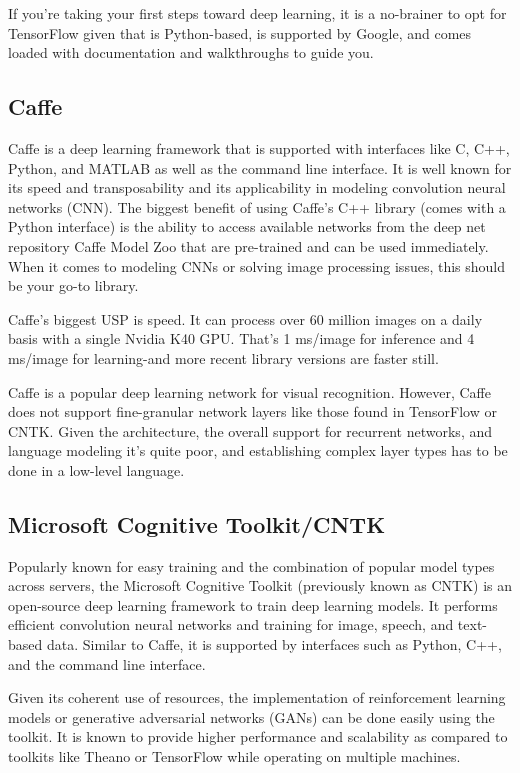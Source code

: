 If you're taking your first steps toward deep learning, it is a no-brainer to opt for TensorFlow given that is Python-based, is supported by Google, and comes loaded with documentation and walkthroughs to guide you.

\subsection{Caffe}
Caffe is a deep learning framework that is supported with interfaces like C, C++, Python, and MATLAB as well as the command line interface. It is well known for its speed and transposability and its applicability in modeling convolution neural networks (CNN). The biggest benefit of using Caffe's C++ library (comes with a Python interface) is the ability to access available networks from the deep net repository Caffe Model Zoo that are pre-trained and can be used immediately. When it comes to modeling CNNs or solving image processing issues, this should be your go-to library.

Caffe's biggest USP is speed. It can process over 60 million images on a daily basis with a single Nvidia K40 GPU. That's 1 ms/image for inference and 4 ms/image for learning-and more recent library versions are faster still.

Caffe is a popular deep learning network for visual recognition. However, Caffe does not support fine-granular network layers like those found in TensorFlow or CNTK. Given the architecture, the overall support for recurrent networks, and language modeling it's quite poor, and establishing complex layer types has to be done in a low-level language.


\subsection{Microsoft Cognitive Toolkit/CNTK}

Popularly known for easy training and the combination of popular model types across servers, the Microsoft Cognitive Toolkit (previously known as CNTK) is an open-source deep learning framework to train deep learning models. It performs efficient convolution neural networks and training for image, speech, and text-based data. Similar to Caffe, it is supported by interfaces such as Python, C++, and the command line interface.

Given its coherent use of resources, the implementation of reinforcement learning models or generative adversarial networks (GANs) can be done easily using the toolkit. It is known to provide higher performance and scalability as compared to toolkits like Theano or TensorFlow while operating on multiple machines.

